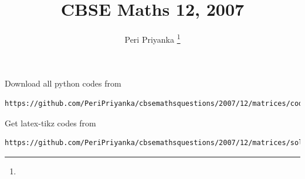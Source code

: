 \documentclass[journal,12pt,twocolumn]{IEEEtran}
\begin{document}
     \def\rightbox#1{\makebox[0in][r]{#1}}
     \def\centbox#1{\makebox[0in]{#1}}
     \def\topbox#1{\raisebox{-\baselineskip}[0in][0in]{#1}}
     \def\midbox#1{\raisebox{-0.5\baselineskip}[0in][0in]{#1}}
\vspace{3cm}
\title{CBSE Maths 12, 2007}
\author{Peri Priyanka
	\thanks{}
}
\maketitle
\newpage
\tableofcontents
\bigskip
\renewcommand{\thefigure}{\theenumi}
\renewcommand{\thetable}{\theenumi}
Download all python codes from 
\begin{lstlisting}
https://github.com/PeriPriyanka/cbsemathsquestions/2007/12/matrices/codes/solutions
\end{lstlisting}
%
Get latex-tikz codes from 
%
\begin{lstlisting}
https://github.com/PeriPriyanka/cbsemathsquestions/2007/12/matrices/solutions
\end{lstlisting}
\end{document}
